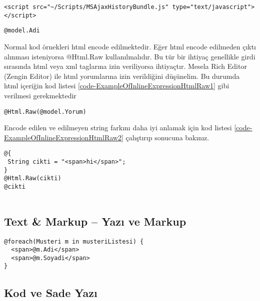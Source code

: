 \documentclass[10pt,a4paper]{article}
\begin{document}
\begin{lstlisting}[label=code-ExampleOfInlineExpression2,caption=html içinde kod örneği 2]
<script src="~/Scripts/MSAjaxHistoryBundle.js" type="text/javascript"></script>
\end{lstlisting}


\begin{lstlisting}[label=code-ExampleOfInlineExpression3,caption=html içinde kod örneği 3]
@model.Adi
\end{lstlisting}

Normal kod örnekleri html encode edilmektedir.
Eğer html encode edilmeden çıktı alınması isteniyorsa @Html.Raw kullanılmalıdır.
Bu tür bir ihtiyaç genellikle girdi sırasında html veya xml taglarına izin veriliyorsa ihtiyaçtır.
Mesela Rich Editor (Zengin Editor) ile html yorumlarına izin verildiğini düşünelim.
Bu durumda html içeriğin kod listesi \ref{code-ExampleOfInlineExpressionHtmlRaw1}
gibi verilmesi gerekmektedir

\begin{lstlisting}[label=code-ExampleOfInlineExpressionHtmlRaw1,caption=html içinde kod örneği 1 html encode yapılmadan]
@Html.Raw(@model.Yorum)
\end{lstlisting}

Encode edilen ve edilmeyen string farkını daha iyi anlamak  için kod listesi \ref{code-ExampleOfInlineExpressionHtmlRaw2} çalıştırıp sonucuna bakınız.

\begin{lstlisting}[label=code-ExampleOfInlineExpressionHtmlRaw2,caption=html içinde kod örneği 2 html encode yapılmadan ]
@{
 String cikti = "<span>hi</span>";
}
@Html.Raw(cikti)
@cikti


\end{lstlisting}




\subsection{Text \& Markup -- Yazı ve Markup}

\begin{lstlisting}[label=code-TextAndMarkup,caption=Yazı ve Markup]
@foreach(Musteri m in musteriListesi) {
  <span>@m.Adi</span> 
  <span>@m.Soyadi</span> 
}
\end{lstlisting}


\subsection{Kod ve Sade Yazı}
\end{document}
